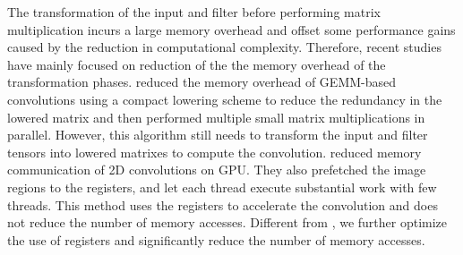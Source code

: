 The transformation of the input and filter before performing matrix multiplication incurs a large memory
overhead and offset some performance gains caused by the reduction in computational complexity. Therefore, recent studies have mainly focused on reduction of the the memory overhead of the transformation phases. \cite{cho2017mec} reduced the memory overhead of GEMM-based convolutions using a
compact lowering scheme to reduce the redundancy in the lowered matrix and then performed multiple small matrix multiplications in parallel.
However, this algorithm still needs to transform the input and filter tensors into lowered matrixes to compute the convolution.
\cite{Iandola2014Communication} reduced memory communication of 2D convolutions on GPU. They also prefetched the image regions to the registers, and let
each  thread execute substantial work with few threads. This method uses the registers to accelerate the convolution and does not reduce the number of
memory accesses. Different from \cite{Iandola2014Communication}, we further optimize the use of registers and significantly reduce the
number of memory accesses.
